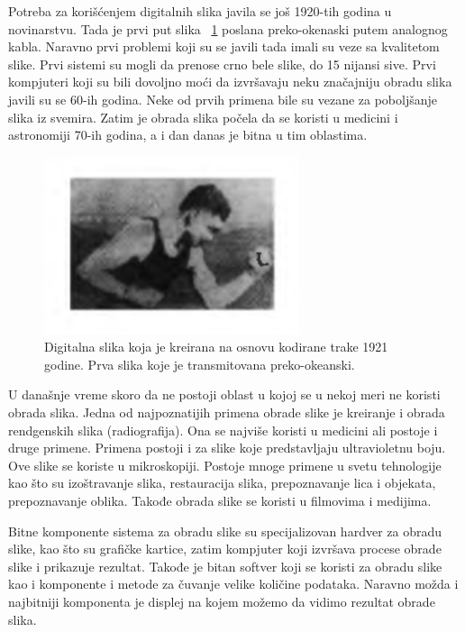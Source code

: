 \documentclass[a4paper,12pt,titlepage]{article}
\begin{document}
Potreba za korišćenjem digitalnih slika javila se još 1920-tih godina u novinarstvu. Tada je prvi put slika ~\ref{slika1921} poslana preko-okenaski putem analognog kabla. Naravno prvi problemi koji su se javili tada imali su veze sa kvalitetom slike. Prvi sistemi su mogli da prenose crno bele slike, do 15 nijansi sive. Prvi kompjuteri koji su bili dovoljno moći da izvršavaju neku značajniju obradu slika javili su se 60-ih godina. Neke od prvih primena bile su vezane za poboljšanje slika iz svemira. Zatim je obrada slika počela da se koristi u medicini i astronomiji 70-ih godina, a i dan danas je bitna u tim oblastima.

\begin{figure}[ht!]
\centering
\includegraphics[width=75mm]{img/prvaPrenesenaSlika.png}
\caption{Digitalna slika koja je kreirana na osnovu kodirane trake 1921 godine. Prva slika koje je transmitovana preko-okeanski.}
\label{slika1921}
\end{figure} 

U današnje vreme skoro da ne postoji oblast u kojoj se u nekoj meri ne koristi obrada slika. Jedna od najpoznatijih primena obrade slike je kreiranje i obrada rendgenskih slika (radiografija). Ona se najviše koristi u medicini ali postoje i druge primene. Primena postoji i za slike koje predstavljaju ultravioletnu boju. Ove slike se koriste u mikroskopiji. Postoje mnoge primene u svetu tehnologije kao što su izoštravanje slika, restauracija slika, prepoznavanje lica i objekata, prepoznavanje oblika. Takođe obrada slike se koristi u filmovima i medijima.  

Bitne komponente sistema za obradu slike su specijalizovan hardver za obradu slike, kao što su grafičke kartice, zatim kompjuter koji izvršava procese obrade slike i prikazuje rezultat. Takođe je bitan softver koji se koristi za obradu slike kao i komponente i metode za čuvanje velike količine podataka. Naravno možda i najbitniji komponenta je displej na kojem možemo da vidimo rezultat obrade slika.            
\end{document}
